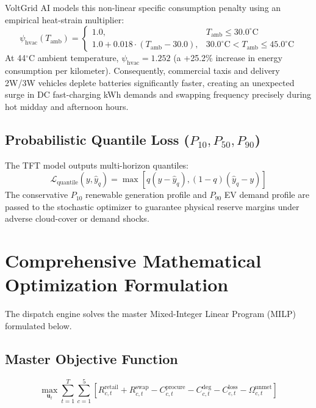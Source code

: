 \documentclass[10.5pt,a4paper]{article}
\begin{document}
VoltGrid AI models this non-linear specific consumption penalty using an empirical heat-strain multiplier:
\begin{equation}
    \psi_{\text{hvac}}(T_{\text{amb}}) = \begin{cases}
        1.0, & T_{\text{amb}} \le 30.0^\circ\text{C} \\
        1.0 + 0.018 \cdot (T_{\text{amb}} - 30.0), & 30.0^\circ\text{C} < T_{\text{amb}} \le 45.0^\circ\text{C}
    \end{cases}
\end{equation}
At 44$^\circ$C ambient temperature, $\psi_{\text{hvac}} = 1.252$ (a +25.2\% increase in energy consumption per kilometer). Consequently, commercial taxis and delivery 2W/3W vehicles deplete batteries significantly faster, creating an unexpected surge in DC fast-charging kWh demands and swapping frequency precisely during hot midday and afternoon hours.

\subsection{Probabilistic Quantile Loss ($P_{10}, P_{50}, P_{90}$)}
The TFT model outputs multi-horizon quantiles:
\begin{equation}
    \mathcal{L}_{\text{quantile}}(y, \hat{y}_q) = \max\left[ q(y - \hat{y}_q), (1 - q)(\hat{y}_q - y) \right]
\end{equation}
The conservative $P_{10}$ renewable generation profile and $P_{90}$ EV demand profile are passed to the stochastic optimizer to guarantee physical reserve margins under adverse cloud-cover or demand shocks.

\section{Comprehensive Mathematical Optimization Formulation}

The dispatch engine solves the master Mixed-Integer Linear Program (MILP) formulated below.

\subsection{Master Objective Function}
\begin{equation}
\max_{\mathbf{u}_t} \sum_{t=1}^T \sum_{c=1}^5 \left[ R_{c,t}^{\text{retail}} + R_{c,t}^{\text{swap}} - C_{c,t}^{\text{procure}} - C_{c,t}^{\text{deg}} - C_{c,t}^{\text{loss}} - \Omega_{c,t}^{\text{unmet}} \right]
\end{equation}
\end{document}
